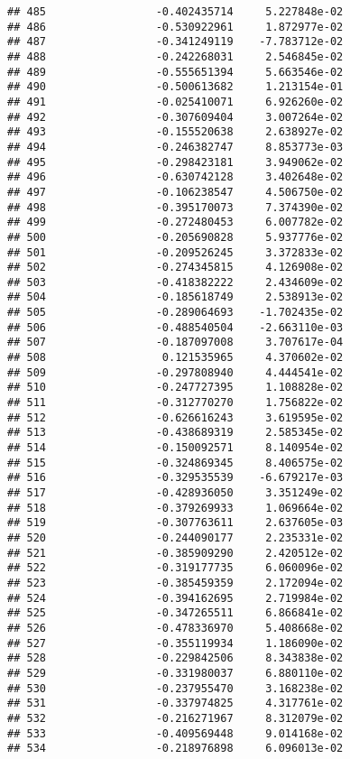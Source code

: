 \documentclass[
]{article}
\begin{document}
\begin{verbatim}
## 485                 -0.402435714     5.227848e-02
## 486                 -0.530922961     1.872977e-02
## 487                 -0.341249119    -7.783712e-02
## 488                 -0.242268031     2.546845e-02
## 489                 -0.555651394     5.663546e-02
## 490                 -0.500613682     1.213154e-01
## 491                 -0.025410071     6.926260e-02
## 492                 -0.307609404     3.007264e-02
## 493                 -0.155520638     2.638927e-02
## 494                 -0.246382747     8.853773e-03
## 495                 -0.298423181     3.949062e-02
## 496                 -0.630742128     3.402648e-02
## 497                 -0.106238547     4.506750e-02
## 498                 -0.395170073     7.374390e-02
## 499                 -0.272480453     6.007782e-02
## 500                 -0.205690828     5.937776e-02
## 501                 -0.209526245     3.372833e-02
## 502                 -0.274345815     4.126908e-02
## 503                 -0.418382222     2.434609e-02
## 504                 -0.185618749     2.538913e-02
## 505                 -0.289064693    -1.702435e-02
## 506                 -0.488540504    -2.663110e-03
## 507                 -0.187097008     3.707617e-04
## 508                  0.121535965     4.370602e-02
## 509                 -0.297808940     4.444541e-02
## 510                 -0.247727395     1.108828e-02
## 511                 -0.312770270     1.756822e-02
## 512                 -0.626616243     3.619595e-02
## 513                 -0.438689319     2.585345e-02
## 514                 -0.150092571     8.140954e-02
## 515                 -0.324869345     8.406575e-02
## 516                 -0.329535539    -6.679217e-03
## 517                 -0.428936050     3.351249e-02
## 518                 -0.379269933     1.069664e-02
## 519                 -0.307763611     2.637605e-03
## 520                 -0.244090177     2.235331e-02
## 521                 -0.385909290     2.420512e-02
## 522                 -0.319177735     6.060096e-02
## 523                 -0.385459359     2.172094e-02
## 524                 -0.394162695     2.719984e-02
## 525                 -0.347265511     6.866841e-02
## 526                 -0.478336970     5.408668e-02
## 527                 -0.355119934     1.186090e-02
## 528                 -0.229842506     8.343838e-02
## 529                 -0.331980037     6.880110e-02
## 530                 -0.237955470     3.168238e-02
## 531                 -0.337974825     4.317761e-02
## 532                 -0.216271967     8.312079e-02
## 533                 -0.409569448     9.014168e-02
## 534                 -0.218976898     6.096013e-02

\end{verbatim}
\end{document}
